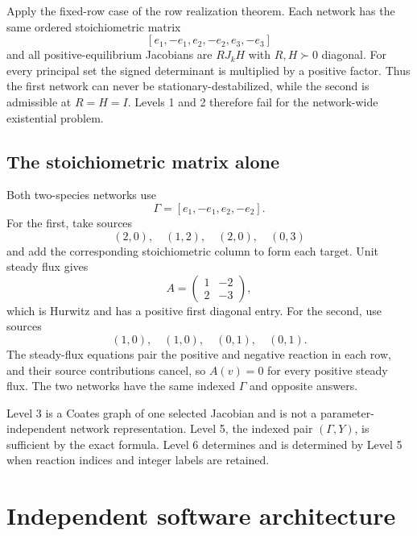 \documentclass[11pt]{article}
\theoremstyle{definition}
\begin{document}
Apply the fixed-row case of the row realization theorem.  Each network has the
same ordered stoichiometric matrix
\[
 [e_1,-e_1,e_2,-e_2,e_3,-e_3]
\]
and all positive-equilibrium Jacobians are $RJ_kH$ with $R,H\succ0$ diagonal.
For every principal set the signed determinant is multiplied by a positive
factor.  Thus the first network can never be stationary-destabilized, while
the second is admissible at $R=H=I$.  Levels 1 and 2 therefore fail for the
network-wide existential problem.

\subsection{The stoichiometric matrix alone}

Both two-species networks use
\[
 \Gamma=[e_1,-e_1,e_2,-e_2].
\]
For the first, take sources
\[
 (2,0),\quad(1,2),\quad(2,0),\quad(0,3)
\]
and add the corresponding stoichiometric column to form each target.  Unit
steady flux gives
\[
 A=\begin{pmatrix}1&-2\\2&-3\end{pmatrix},
\]
which is Hurwitz and has a positive first diagonal entry.  For the second, use
sources
\[
 (1,0),\quad(1,0),\quad(0,1),\quad(0,1).
\]
The steady-flux equations pair the positive and negative reaction in each row,
and their source contributions cancel, so $A(v)=0$ for every positive steady
flux.  The two networks have the same indexed $\Gamma$ and opposite answers.

Level 3 is a Coates graph of one selected Jacobian and is not a
parameter-independent network representation.  Level 5, the indexed pair
$(\Gamma,Y)$, is sufficient by the exact formula.  Level 6 determines and is
determined by Level 5 when reaction indices and integer labels are retained.

\section{Independent software architecture}
\end{document}
